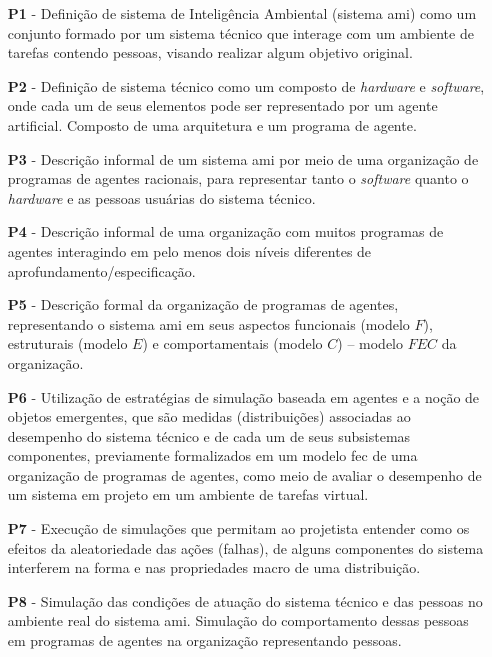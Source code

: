 \begin{itemize}
    \item[\textbf{P1} -] Definição de sistema de Inteligência Ambiental (sistema \acrshort{ami}) como um conjunto formado por um sistema técnico que interage com um ambiente de tarefas contendo pessoas, visando realizar algum objetivo original.
    
    \item[\textbf{P2} -] Definição de sistema técnico como um composto de \textit{hardware} e \textit{software}, onde cada um de seus elementos pode ser representado por um agente artificial. Composto de uma arquitetura e um programa de agente.
    
    \item[\textbf{P3} -] Descrição informal de um sistema \acrshort{ami} por meio de uma organização de programas de agentes racionais, para representar tanto o \textit{software} quanto o \textit{hardware} e as pessoas usuárias do sistema técnico. 
    
    \item[\textbf{P4} -] Descrição informal de uma organização com muitos programas de agentes interagindo em pelo menos dois níveis diferentes de aprofundamento/especificação.
    
    \item[\textbf{P5} -] Descrição formal da organização de programas de agentes, representando o sistema \acrshort{ami} em seus aspectos funcionais (modelo $F$), estruturais (modelo $E$) e comportamentais (modelo $C$) – modelo $FEC$ da organização.
    
    \item[\textbf{P6} -] Utilização de estratégias de simulação baseada em agentes e a noção de objetos emergentes, que são medidas (distribuições) associadas ao desempenho do sistema técnico e de cada um de seus subsistemas componentes, previamente formalizados em um modelo \acrshort{fec} de uma organização de programas de agentes, como meio de avaliar o desempenho de um sistema em projeto em um ambiente de tarefas virtual.
    
    \item[\textbf{P7} -] Execução de simulações que permitam ao projetista entender como os efeitos da aleatoriedade das ações (falhas), de alguns componentes do sistema interferem na forma e nas propriedades macro de uma distribuição.
    
    \item[\textbf{P8} -] Simulação das condições de atuação do sistema técnico e das pessoas no ambiente real do sistema \acrshort{ami}. Simulação do comportamento dessas pessoas em programas de agentes na organização representando pessoas.
    

\end{itemize}
